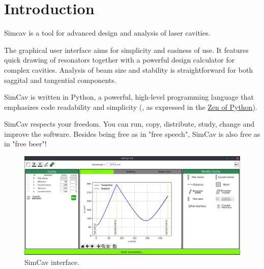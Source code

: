 \documentclass[11pt,a4paper,article,oneside]{memoir}
\title{}
\author{Julio M. Rodríguez-García}
\date{}
\begin{document}
	\graphicspath{{./Figures/}}

	\maketitle

	\mainmatter
	\begin{KeepFromToc}
		\tableofcontents
	\end{KeepFromToc}

	\section{Introduction}
	Simcav is a tool for advanced design and analysis of laser cavities. 
	
	The graphical user interface aims for simplicity and easiness of use. It features quick drawing of resonators together with a powerful design calculator for complex cavities. Analysis of beam size and stability is straightforward for both saggital and tangential components. 
	
	SimCav is written in Python, a powerful, high-level programming language that emphasizes code readability and simplicity (, as expressed in the \href{https://www.python.org/dev/peps/pep-0020/}{Zen of Python}).
	
	SimCav respects your freedom. You can run, copy, distribute, study, change and improve the software. Besides being free as in "free speech", SimCav is also free as in "free beer"! 

	\begin{figure}[h!]
		\centering
		\includegraphics[width=0.8\linewidth]{simcav.png}
		\caption[SimCav]{SimCav interface.}
		\label{fig:simcav}
	\end{figure}
\end{document}
